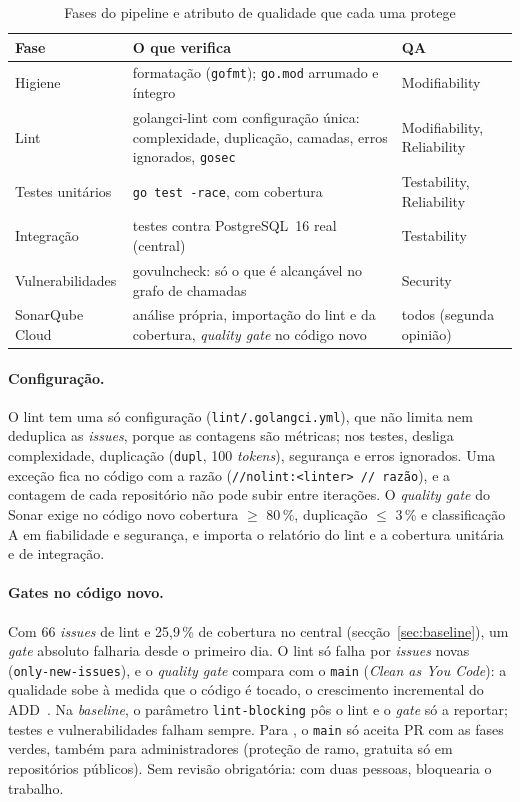 \begin{table}[htbp]
  \centering\small
  \caption{Fases do pipeline e atributo de qualidade que cada uma protege}
  \label{tab:pipeline}
  \begin{tabularx}{\linewidth}{l>{\raggedright\arraybackslash}Xl}
    \toprule
    Fase & O que verifica & QA \\
    \midrule
    Higiene & formatação (\texttt{gofmt}); \texttt{go.mod} arrumado e íntegro & Modifiability \\
    Lint & golangci-lint com configuração única: complexidade, duplicação, camadas, erros ignorados, \texttt{gosec} & Modifiability, Reliability \\
    Testes unitários & \texttt{go test -race}, com cobertura & Testability, Reliability \\
    Integração & testes contra PostgreSQL~16 real (central) & Testability \\
    Vulnerabilidades & govulncheck: só o que é alcançável no grafo de chamadas & Security \\
    SonarQube Cloud & análise própria, importação do lint e da cobertura, \emph{quality gate} no código novo & todos (segunda opinião) \\
    \bottomrule
  \end{tabularx}
\end{table}

\paragraph{Configuração.}
O lint tem uma só configuração (\texttt{lint/.golangci.yml}), que não limita nem deduplica as \emph{issues}, porque
as contagens são métricas; nos testes, desliga complexidade, duplicação (\texttt{dupl}, 100 \emph{tokens}), segurança e
erros ignorados. Uma exceção fica no código com a razão (\texttt{//nolint:<linter> // razão}), e a contagem de
cada repositório não pode subir entre iterações. O \emph{quality gate} do Sonar exige no código novo cobertura
$\ge$ 80\,\%, duplicação $\le$ 3\,\% e classificação A em fiabilidade e segurança, e importa o relatório do lint e
a cobertura unitária e de integração.

\paragraph{Gates no código novo.}
Com 66 \emph{issues} de lint e 25,9\,\% de cobertura no central (secção~\ref{sec:baseline}), um \emph{gate}
absoluto falharia desde o primeiro dia. O lint só falha por \emph{issues} novas (\texttt{only-new-issues}), e o
\emph{quality gate} compara com o \texttt{main} (\emph{Clean as You Code}): a qualidade sobe à medida que o código é
tocado, o crescimento incremental do ADD~\cite{bastofernandes2026}. Na \emph{baseline}, o parâmetro \texttt{lint-blocking}
pôs o lint e o \emph{gate} só a reportar; testes e vulnerabilidades falham sempre. Para , o \texttt{main} só
aceita PR com as fases verdes, também para administradores (proteção de ramo, gratuita só em repositórios
públicos). Sem revisão obrigatória: com duas pessoas, bloquearia o trabalho.

